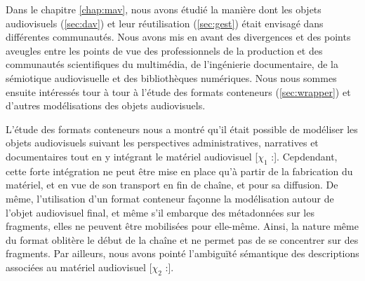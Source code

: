 Dans le chapitre \ref{chap:mav}, nous avons étudié la manière dont les objets audiovisuels (\ref{sec:dav}) et leur réutilisation (\ref{sec:gest}) était envisagé dans différentes communautés.
Nous avons mis en avant des divergences et des points aveugles entre les points de vue des professionnels de la production et des communautés scientifiques du multimédia, de l'ingénierie documentaire, de la sémiotique audiovisuelle et des bibliothèques numériques.
Nous nous sommes ensuite intéressés tour à tour à l'étude des formats conteneurs (\ref{sec:wrapper}) et d'autres modélisations des objets audiovisuels.

L'étude des formats conteneurs nous a montré qu'il était possible de modéliser les objets audiovisuels suivant les perspectives administratives, narratives et documentaires tout en y intégrant le matériel audiovisuel [$\chi_1$ :]. 
Cepdendant, cette forte intégration ne peut être mise en place qu'à partir de la fabrication du matériel, et en vue de son transport en fin de chaîne, et pour sa diffusion.
De même, l'utilisation d'un format conteneur façonne la modélisation autour de l'objet audiovisuel final, et même s'il embarque des métadonnées sur les fragments, elles ne peuvent être mobilisées pour elle-même.
Ainsi, la nature même du format oblitère le début de la chaîne et ne permet pas de se concentrer sur des fragments.
Par ailleurs, nous avons pointé l'ambiguïté sémantique des descriptions associées au matériel audiovisuel [$\chi_2$ :].


